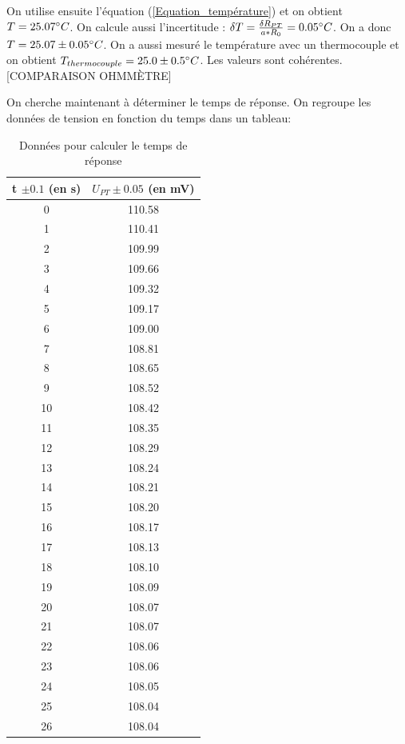 \documentclass[12pt]{article}
\begin{document}
On utilise ensuite l'équation (\ref{Equation_température}) et on obtient $T=25.07 \degree C$. On calcule aussi l'incertitude : $\delta T = \frac{\delta R_{PT}}{a*R_0}=0.05 \degree C$. On a donc $T=25.07\pm 0.05 \degree C$. On a aussi mesuré le température avec un thermocouple et on obtient $T_{thermocouple}=25.0\pm 0.5 \degree C$. Les valeurs sont cohérentes. 
[COMPARAISON OHMMÈTRE]

\newpage
On cherche maintenant à déterminer le temps de réponse. On regroupe les données de tension en fonction du temps dans un tableau:
\begin{table}[!h]
	\begin{center}
		\begin{tabular}{|c|c|}
\hline
 t $\pm 0.1$ (en s) &  $U_{PT}\pm 0.05$ (en mV) \\
\hline
        0 &        110.58 \\
        1 &        110.41 \\
        2 &        109.99 \\
        3 &        109.66 \\
        4 &        109.32 \\
        5 &        109.17 \\
        6 &        109.00 \\
        7 &        108.81 \\
        8 &        108.65 \\
        9 &        108.52 \\
       10 &        108.42 \\
       11 &        108.35 \\
       12 &        108.29 \\
       13 &        108.24 \\
       14 &        108.21 \\
       15 &        108.20 \\
       16 &        108.17 \\
       17 &        108.13 \\
       18 &        108.10 \\
       19 &        108.09 \\
       20 &        108.07 \\
       21 &        108.07 \\
       22 &        108.06 \\
       23 &        108.06 \\
       24 &        108.05 \\
       25 &        108.04 \\
       26 &        108.04 \\
\hline
\end{tabular}
	\end{center}
	\label{Tableau_Data}
	\caption{Données pour calculer le temps de réponse}
\end{table}
\end{document}
